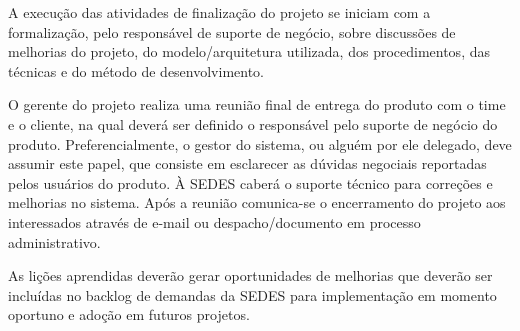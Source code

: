 A execução das atividades de finalização do projeto se iniciam com a formalização, pelo responsável de suporte de negócio, sobre discussões de melhorias do projeto, do modelo/arquitetura utilizada, dos  procedimentos, das técnicas e do método de desenvolvimento. 

O gerente do projeto realiza uma reunião final de entrega do produto com o time e o cliente, na qual deverá ser definido o responsável pelo suporte de negócio do produto. Preferencialmente, o gestor do sistema, ou alguém por ele delegado, deve assumir este papel, que consiste em esclarecer as dúvidas negociais reportadas pelos usuários do produto. À SEDES caberá o suporte técnico para correções e melhorias no sistema. Após a reunião comunica-se o encerramento do projeto aos interessados através de e-mail ou despacho/documento em processo administrativo.

As lições aprendidas deverão gerar oportunidades de melhorias que deverão ser incluídas no backlog de demandas da SEDES para implementação em momento oportuno e adoção em futuros projetos.
